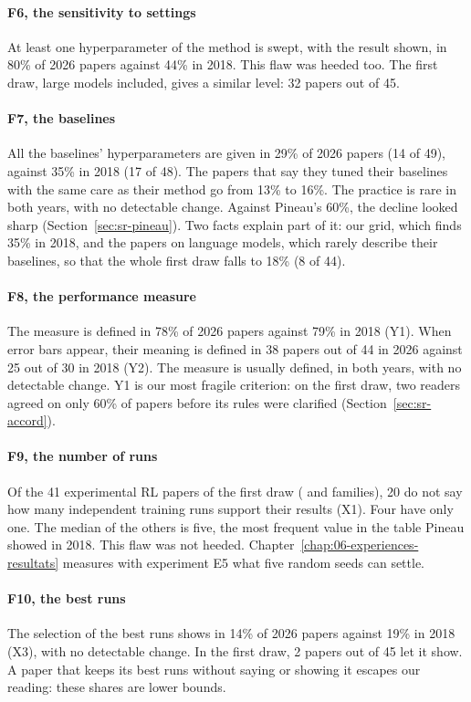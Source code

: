 \paragraph{F6, the sensitivity to settings}
At least one hyperparameter of the method is swept, with the result shown, in 80\% of 2026 papers
against 44\% in 2018. This flaw was heeded too. The first draw, large models included, gives a similar
level: 32 papers out of 45.

\paragraph{F7, the baselines}
All the baselines' hyperparameters are given in 29\% of 2026 papers (14 of 49), against 35\% in 2018
(17 of 48). The papers that say they tuned their baselines with the same care as their method go from
13\% to 16\%. The practice is rare in both years, with no detectable change. Against Pineau's
60\%, the decline looked sharp (Section~\ref{sec:sr-pineau}). Two facts explain part of it: our grid,
which finds 35\% in 2018, and the papers on language models, which rarely describe their baselines, so
that the whole first draw falls to 18\% (8 of 44).

\paragraph{F8, the performance measure}
The measure is defined in 78\% of 2026 papers against 79\% in 2018 (Y1). When error bars appear, their
meaning is defined in 38 papers out of 44 in 2026 against 25 out of 30 in 2018 (Y2). The measure is
usually defined, in both years, with no detectable change. Y1 is our most fragile criterion: on the
first draw, two readers agreed on only 60\% of papers before its rules were clarified
(Section~\ref{sec:sr-accord}).

\paragraph{F9, the number of runs}
Of the 41 experimental RL papers of the first draw ( and  families), 20 do not
say how many independent training runs support their results (X1). Four have only one. The median of
the others is five, the most frequent value in the table Pineau showed in 2018. This flaw was not heeded.
Chapter~\ref{chap:06-experiences-resultats} measures with experiment E5 what five random seeds can
settle.

\paragraph{F10, the best runs}
The selection of the best runs shows in 14\% of 2026 papers against 19\% in 2018 (X3), with no
detectable change. In the first draw, 2 papers out of 45 let it show. A paper that keeps its best runs
without saying or showing it escapes our reading: these shares are lower bounds.

